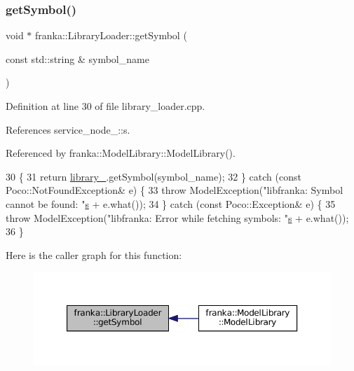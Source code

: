 \subsubsection{\texorpdfstring{get\+Symbol()}{getSymbol()}}
{\footnotesize\ttfamily void $\ast$ franka\+::\+Library\+Loader\+::get\+Symbol (\begin{DoxyParamCaption}\item[{const std\+::string \&}]{symbol\+\_\+name }\end{DoxyParamCaption})}



Definition at line 30 of file library\+\_\+loader.\+cpp.



References service\+\_\+node\+\_\+::s.



Referenced by franka\+::\+Model\+Library\+::\+Model\+Library().


\begin{DoxyCode}
30                                                                \{
31   \textcolor{keywordflow}{return} \hyperlink{classfranka_1_1LibraryLoader_aa60d8a00447a53d4c754c9959adf39e1}{library\_}.getSymbol(symbol\_name);
32 \} \textcolor{keywordflow}{catch} (\textcolor{keyword}{const} Poco::NotFoundException& e) \{
33   \textcolor{keywordflow}{throw} ModelException(\textcolor{stringliteral}{"libfranka: Symbol cannot be found: "}\hyperlink{namespaceservice__node__3_aa976421a49e0b54f23833423400849ae}{s} + e.what());
34 \} \textcolor{keywordflow}{catch} (\textcolor{keyword}{const} Poco::Exception& e) \{
35   \textcolor{keywordflow}{throw} ModelException(\textcolor{stringliteral}{"libfranka: Error while fetching symbols: "}\hyperlink{namespaceservice__node__3_aa976421a49e0b54f23833423400849ae}{s} + e.what());
36 \}
\end{DoxyCode}
Here is the caller graph for this function\+:
\nopagebreak
\begin{figure}[H]
\begin{center}
\leavevmode
\includegraphics[width=350pt]{classfranka_1_1LibraryLoader_aa1ca9b340a61553992e9bc43d04c5376_icgraph}
\end{center}
\end{figure}


